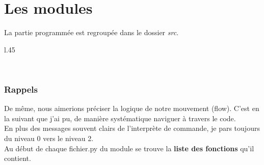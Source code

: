 \section{Les modules}

La partie programmée est regroupée dans le dossier \emph{src}. \\


 \begin{wrapfigure}{l}{.45\textwidth} %
\end{wrapfigure}

~\\ 

\subsubsection{Rappels}

De même, nous aimerions préciser la logique de notre mouvement (flow). C'est en la suivant que j'ai pu, de manière systématique naviguer à travers le code. \\

En plus des messages souvent clairs de l'interprète de commande, je pars toujours du niveau 0 vers le niveau 2. \\  

Au début de chaque fichier.py du module se trouve la \textbf{liste des fonctions} qu'il contient. \\ \\

